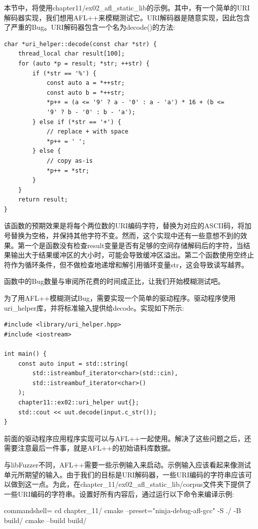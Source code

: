 本节中，将使用chapter11/ex02\_afl\_static\_lib的示例。其中，有一个简单的URI解码器实现，我们想用AFL++来模糊测试它。URI解码器是随意实现，因此包含了严重的Bug。URI解码器包含一个名为decode()的方法:

\begin{lstlisting}[style=styleCXX]
char *uri_helper::decode(const char *str) {
	thread_local char result[100];
	for (auto *p = result; *str; ++str) {
		if (*str == '%') {
			const auto a = *++str;
			const auto b = *++str;
			*p++ = (a <= '9' ? a - '0' : a - 'a') * 16 + (b <=
			'9' ? b - '0' : b - 'a');
		} else if (*str == '+') {
			// replace + with space
			*p++ = ' ';
		} else {
			// copy as-is
			*p++ = *str;
		}
	}
	return result;
}
\end{lstlisting}

该函数的预期效果是将每个两位数的URI编码字符，替换为对应的ASCII码，将加号替换为空格，并保持其他字符不变。然而，这个实现中还有一些意想不到的效果。第一个是函数没有检查result变量是否有足够的空间存储解码后的字符，当结果输出大于结果缓冲区的大小时，可能会导致缓冲区溢出。第二个函数使用空终止符作为循环条件，但不做检查地递增和解引用循环变量str，这会导致读写越界。

函数中的Bug数量与审阅所花费的时间成正比，让我们开始模糊测试吧。

为了用AFL++模糊测试Bug，需要实现一个简单的驱动程序。驱动程序使用uri\_helper库，并将标准输入提供给decode。实现如下所示:

\begin{lstlisting}[style=styleCXX]
#include <library/uri_helper.hpp>
#include <iostream>

int main() {
	const auto input = std::string(
		std::istreambuf_iterator<char>(std::cin),
		std::istreambuf_iterator<char>()
	);
	chapter11::ex02::uri_helper uut{};
	std::cout << uut.decode(input.c_str());
}
\end{lstlisting}

前面的驱动程序应用程序实现可以与AFL++一起使用。解决了这些问题之后，还需要注意最后一件事，就是AFL++的初始语料库数据。

与libFuzzer不同，AFL++需要一些示例输入来启动。示例输入应该看起来像测试单元所期望的输入。由于我们的目标是URI解码器，一些URI编码的字符串应该可以做到这一点。为此，在chapter\_11/ex02\_afl\_static\_lib/corpus文件夹下提供了一些URI编码的字符串。设置好所有内容后，通过运行以下命令来编译示例:

\begin{tcblisting}{commandshell={}}
cd chapter_11/
cmake --preset="ninja-debug-afl-gcc" -S ./ -B build/
cmake --build build/
\end{tcblisting}

